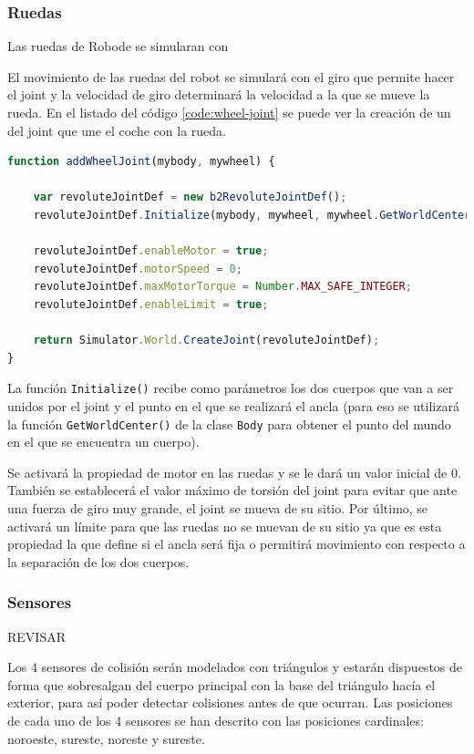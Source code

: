 \subsubsection*{Ruedas}

Las ruedas de Robode se simularan con 

El movimiento de las ruedas del robot se simulará con el giro que permite hacer el joint y la velocidad de giro determinará la velocidad a la que se mueve la rueda. En el listado del código  \ref{code:wheel-joint} se puede ver la creación de un del joint que une el coche con la rueda.

\begin{lstlisting}[language={Javascript},label={code:wheel-joint}, caption={Función que crea el joint que une la rueda al coche.}]
function addWheelJoint(mybody, mywheel) {

	var revoluteJointDef = new b2RevoluteJointDef();
	revoluteJointDef.Initialize(mybody, mywheel, mywheel.GetWorldCenter());

	revoluteJointDef.enableMotor = true;
	revoluteJointDef.motorSpeed = 0;
	revoluteJointDef.maxMotorTorque = Number.MAX_SAFE_INTEGER;
	revoluteJointDef.enableLimit = true;

	return Simulator.World.CreateJoint(revoluteJointDef);
}
\end{lstlisting}

La función \texttt{Initialize()} recibe como parámetros los dos cuerpos que van a ser unidos por el joint y el punto en el que se realizará el ancla (para eso se utilizará la función \texttt{GetWorldCenter()} de la clase \texttt{Body} para obtener el punto del mundo en el que se encuentra un cuerpo).

Se activará la propiedad de motor en las ruedas y se le dará un valor inicial de 0. También se establecerá el valor máximo de torsión del joint para evitar que ante una fuerza de giro muy grande, el joint se mueva de su sitio. Por último, se activará un límite para que las ruedas no se muevan de su sitio ya que es esta propiedad la que define si el ancla será fija o permitirá movimiento con respecto a la separación de los dos cuerpos.


\subsubsection*{Sensores}

{\color{green}REVISAR}

Los 4 sensores de colisión serán modelados con triángulos y estarán dispuestos de forma que sobresalgan del cuerpo principal con la base del triángulo hacía el exterior, para así poder detectar colisiones antes de que ocurran. Las posiciones de cada uno de los 4 sensores se han descrito con las posiciones cardinales: noroeste, sureste, noreste y sureste. 


